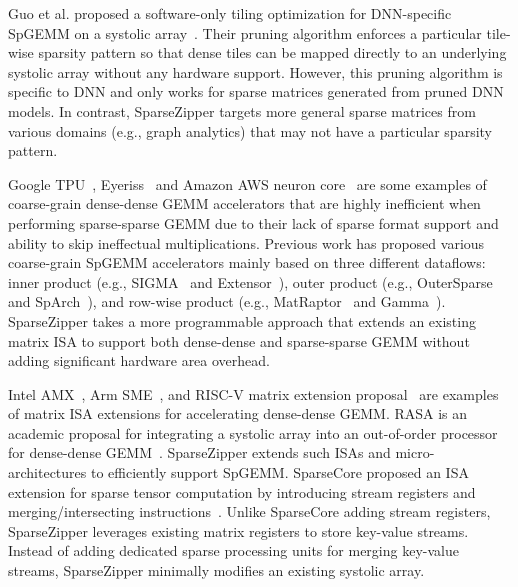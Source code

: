 Guo et al. proposed a software-only tiling optimization for DNN-specific SpGEMM
on a systolic array~\cite{guo-sw-only-spgemm-sc2020}.
Their pruning algorithm enforces a particular tile-wise sparsity pattern so
that dense tiles can be mapped directly to an underlying systolic array without
any hardware support.
However, this pruning algorithm is specific to DNN and only works for sparse
matrices generated from pruned DNN models.
In contrast, SparseZipper targets more general sparse matrices from various
domains (e.g., graph analytics) that may not have a particular sparsity
pattern.

Google TPU~\cite{jouppi-datacenter-isca2017,teich-google-tpu-v2-blog2018,jouppi-google-tpu-v2-v3-cacm2020,jouppi-tpu-v4-isca2023},
Eyeriss~\cite{chen-eyeriss-isscc2016} and Amazon AWS neuron
core~\cite{aws-neuron-core-2023} are some examples of coarse-grain dense-dense
GEMM accelerators that are highly inefficient when performing sparse-sparse
GEMM due to their lack of sparse format support and ability to skip ineffectual
multiplications.
Previous work has proposed various coarse-grain SpGEMM accelerators mainly
based on three different dataflows: inner product (e.g.,
SIGMA~\cite{qin-sigma-hpca2020} and Extensor~\cite{hegde-extensor-micro2019}),
outer product (e.g., OuterSparse~\cite{pal-outerspace-hpca2018} and
SpArch~\cite{zhang-sparch-hpca2020}), and row-wise product (e.g.,
MatRaptor~\cite{srivastava-matraptor-micro2020} and
Gamma~\cite{zhang-gamma-asplos2021}).
SparseZipper takes a more programmable approach that extends an existing matrix
ISA to support both dense-dense and sparse-sparse GEMM without adding
significant hardware area overhead.

Intel AMX~\cite{intel-amx-web,nassif-intel-sapphire-isscc2022}, Arm
SME~\cite{arm-sme-web}, and RISC-V matrix extension
proposal~\cite{riscv-mtx-ext-proposal-web} are examples of matrix ISA
extensions for accelerating dense-dense GEMM.
RASA is an academic proposal for integrating a systolic array into an
out-of-order processor for dense-dense GEMM~\cite{jeong-rasa-dac2021}.
SparseZipper extends such ISAs and micro-architectures to
efficiently support SpGEMM.
SparseCore proposed an ISA extension for sparse tensor computation by
introducing stream registers and merging/intersecting
instructions~\cite{rao-sparsecore-asplos2022}.
Unlike SparseCore adding stream registers, SparseZipper leverages existing
matrix registers to store key-value streams.
Instead of adding dedicated sparse processing units for merging key-value
streams, SparseZipper minimally modifies an existing systolic array.